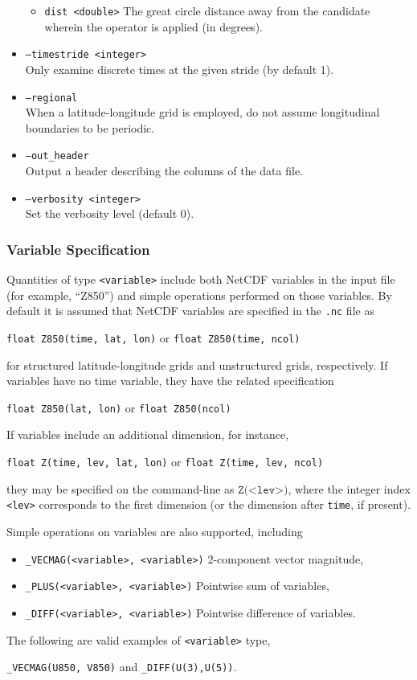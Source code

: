 \documentclass[gmdd, hvmath, online]{copernicus_discussions}
\begin{document}
\begin{itemize}
\begin{itemize}
\item[] \texttt{dist <double>}  The great circle distance away from the candidate wherein the operator is applied (in degrees).
\end{itemize}
\item[] \texttt{--timestride <integer>} \\ Only examine discrete times at the given stride (by default 1).
\item[] \texttt{--regional} \\ When a latitude-longitude grid is employed, do not assume longitudinal boundaries to be periodic.
\item[] \texttt{--out\_header} \\ Output a header describing the columns of the data file.
\item[] \texttt{--verbosity <integer>} \\ Set the verbosity level (default 0).
\end{itemize}

\subsubsection{Variable Specification}

Quantities of type \texttt{<variable>} include both NetCDF variables in the input file (for example, ``Z850'') and simple operations performed on those variables.  By default it is assumed that NetCDF variables are specified in the \texttt{.nc} file as
\begin{center}
\texttt{float Z850(time, lat, lon)} \quad or \quad \texttt{float Z850(time, ncol)}
\end{center} for structured latitude-longitude grids and unstructured grids, respectively.  If variables have no time variable, they have the related specification
\begin{center}
\texttt{float Z850(lat, lon)} \quad or \quad \texttt{float Z850(ncol)}
\end{center}  If variables include an additional dimension, for instance,
\begin{center}
\texttt{float Z(time, lev, lat, lon)} \quad or \quad \texttt{float Z(time, lev, ncol)}
\end{center} they may be specified on the command-line as $\texttt{Z(<lev>)}$, where the integer index \texttt{<lev>} corresponds to the first dimension (or the dimension after \texttt{time}, if present).  

Simple operations on variables are also supported, including
\begin{itemize}
\item[] \texttt{\_VECMAG(<variable>, <variable>)} 2-component vector magnitude,
\item[] \texttt{\_PLUS(<variable>, <variable>)} Pointwise sum of variables,
\item[] \texttt{\_DIFF(<variable>, <variable>)} Pointwise difference of variables.
\end{itemize}  The following are valid examples of \texttt{<variable>} type,
\begin{center}
\texttt{\_VECMAG(U850, V850)} \quad and \quad \texttt{\_DIFF(U(3),U(5))}.
\end{center}
\end{document}
